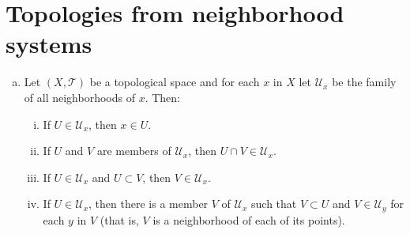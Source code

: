 \section{Topologies from neighborhood systems}
\label{exercises:01-B}

\begin{enumerate}[(a)]
  \item
    Let \((X,\mathcal{T})\) be a topological space and for each \(x\) in \(X\)
    let \(\mathcal{U}_{x}\) be the family of all neighborhoods of \(x\). Then:
    \begin{enumerate}[(i)]
      \item
        If \(U\in\mathcal{U}_{x}\), then \(x\in U\).
      \item
        If \(U\) and \(V\) are members of \(\mathcal{U}_{x}\), then
        \(U\cap V\in\mathcal{U}_{x}\).
      \item
        If \(U\in\mathcal{U}_{x}\) and \(U\subset V\), then
        \(V\in\mathcal{U}_{x}\).
      \item
        If \(U\in\mathcal{U}_{x}\), then there is a member \(V\) of
        \(\mathcal{U}_{x}\) such that \(V\subset U\) and \(V\in\mathcal{U}_{y}\)
        for each \(y\) in \(V\) (that is, \(V\) is a neighborhood of each of its
        points).
    \end{enumerate}
\end{enumerate}

